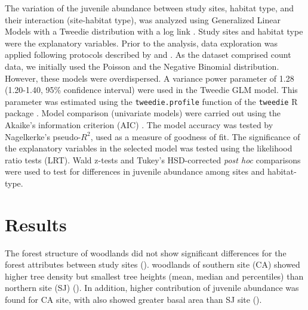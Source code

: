The variation of the juvenile abundance between study sites, habitat type, and their interaction (site-habitat type), was analyzed using Generalized Linear Models with a Tweedie distribution with a log link \autocite{DunnSmyth2018TweedieGLMs}. Study sites and habitat type were the explanatory variables. Prior to the analysis, data exploration was applied following protocols described by \citet{Zuuretal2010ProtocolData} and \citet{IenoZuur2015BeginnerGuide}. As the dataset comprised count data, we initially used the Poisson and the Negative Binomial distribution. However, these models were overdispersed. A variance power parameter of 1.28 (1.20-1.40, 95\% confidence interval) were used in the Tweedie GLM model. This parameter was estimated using the \texttt{tweedie.profile} function of the \texttt{tweedie} R package \autocites{DunnSmyth2005SeriesEvaluation,Dunn2017Tweedie}. Model comparison (univariate models) were carried out using the Akaike's information criterion (AIC) \autocites{BurnhamAnderson2010ModelSelection}. The model accuracy was tested by Nagelkerke's pseudo-$R^2$, used as a measure of goodness of fit. The significance of the explanatory variables in the selected model was tested using the likelihood ratio tests (LRT). Wald z-tests and Tukey's HSD-corrected \emph{post hoc} comparisons were used to test for differences in juvenile abundance among sites and habitat-type. 


\section{Results}\label{sec:coloniza:results}

The forest structure of \Qpy woodlands did not show significant differences for the forest attributes between study sites  (). \Qpy woodlands of southern site (CA) showed higher tree density but smallest tree heights (mean, median and percentiles) than northern site (SJ) (). In addition, higher contribution of juvenile abundance was found for CA site, with also showed greater basal area than SJ site ().

